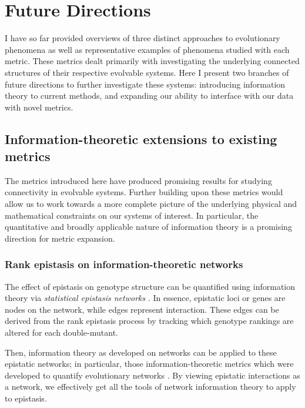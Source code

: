 \section{Future Directions}

I have so far provided overviews of three distinct approaches to evolutionary phenomena as well as representative examples of phenomena studied with each metric. These metrics dealt primarily with investigating the underlying connected structures of their respective evolvable systems. Here I present two branches of future directions to further investigate these systems: introducing information theory to current methods, and expanding our ability to interface with our data with novel metrics.

\subsection{Information-theoretic extensions to existing metrics}

The metrics introduced here have produced promising results for studying connectivity in evolvable systems. Further building upon these metrics would allow us to work towards a more complete picture of the underlying physical and mathematical constraints on our systems of interest. In particular, the quantitative and broadly applicable nature of information theory is a promising direction for metric expansion.


\subsubsection{Rank epistasis on information-theoretic networks}

The effect of epistasis on genotype structure can be quantified using information theory via \textit{statistical epistasis networks} \citep{moore_flexible_2006, mckinney_six_2012}.
In essence, epistatic loci or genes are nodes on the network, while edges represent interaction. 
These edges can be derived from the rank epistasis process by tracking which genotype rankings are altered for each double-mutant. 

Then, information theory as developed on networks can be applied to these epistatic networks; in particular, those information-theoretic metrics which were developed to quantify evolutionary networks \citep{sole_information_2004, adami_information_2011, carpi_analyzing_2011}. By viewing epistatic interactions as a network, we effectively get all the tools of network information theory to apply to epistasis.

